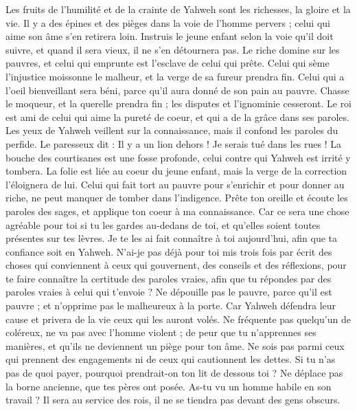 \begin{multicols}{2}
Les fruits de l’humilité et de la crainte de Yahweh sont les richesses, la gloire et la vie.
Il y a des épines et des pièges dans la voie de l’homme pervers ; celui qui aime son âme s'en retirera loin.
Instruis le jeune enfant selon la voie qu’il doit suivre, et quand il sera vieux, il ne s'en détournera pas.
Le riche domine sur les pauvres, et celui qui emprunte est l’esclave de celui qui prête.
Celui qui sème l’injustice moissonne le malheur, et la verge de sa fureur prendra fin.
Celui qui a l'oeil bienveillant sera béni, parce qu'il aura donné de son pain au pauvre.
Chasse le moqueur, et la querelle prendra fin ; les disputes et l'ignominie cesseront.
Le roi est ami de celui qui aime la pureté de coeur, et qui a de la grâce dans ses paroles.
Les yeux de Yahweh veillent sur la connaissance, mais il confond les paroles du perfide.
Le paresseux dit : Il y a un lion dehors ! Je serais tué dans les rues !
La bouche des courtisanes est une fosse profonde, celui contre qui Yahweh est irrité y tombera.
La folie est liée au coeur du jeune enfant, mais la verge de la correction l’éloignera de lui.
Celui qui fait tort au pauvre pour s’enrichir et pour donner au riche, ne peut manquer de tomber dans l'indigence.
Prête ton oreille et écoute les paroles des sages, et applique ton coeur à ma connaissance.
Car ce sera une chose agréable pour toi si tu les gardes au-dedans de toi, et qu’elles soient toutes présentes sur tes lèvres.
Je te les ai fait connaître à toi aujourd’hui, afin que ta confiance soit en Yahweh.
N’ai-je pas déjà pour toi mis trois fois par écrit des choses qui conviennent à ceux qui gouvernent, des conseils et des réflexions,
pour te faire connaître la certitude des paroles vraies, afin que tu répondes par des paroles vraies à celui qui t’envoie ?
Ne dépouille pas le pauvre, parce qu'il est pauvre ; et n’opprime pas le malheureux à la porte.
Car Yahweh défendra leur cause et privera de la vie ceux qui les auront volés.
Ne fréquente pas quelqu’un de coléreux, ne va pas avec l'homme violent ;
de peur que tu n’apprennes ses manières, et qu’ils ne deviennent un piège pour ton âme.
Ne sois pas parmi ceux qui prennent des engagements ni de ceux qui cautionnent les dettes.
Si tu n'as pas de quoi payer, pourquoi prendrait-on ton lit de dessous toi ?
Ne déplace pas la borne ancienne, que tes pères ont posée.
As-tu vu un homme habile en son travail ? Il sera au service des rois, il ne se tiendra pas devant des gens obscurs.

\end{multicols}
